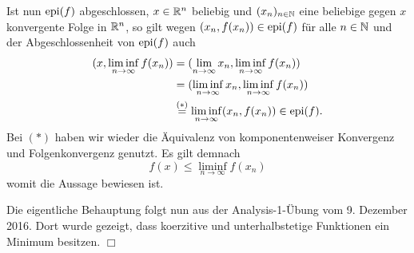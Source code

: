 \begin{itemize}
 \newpage

 Ist nun $\operatorname{epi}(f)$ abgeschlossen, $x\in\mathbb{R}^n$ beliebig und $(x_n)_{n\in\mathbb{N}}$ eine beliebige gegen $x$ konvergente Folge in $\mathbb{R}^n$, so gilt
 wegen $(x_n,f(x_n))\in\operatorname{epi}(f)$ für alle $n\in\mathbb{N}$ und der Abgeschlossenheit von $\operatorname{epi}(f) $ auch
 \begin{align*}
 (x,\liminf_{n\to\infty}f(x_n)) &= (\lim_{n\to\infty}x_n, \liminf_{n\to\infty}f(x_n)) \\
&= (\liminf_{n\to\infty} x_n, \liminf_{n\to\infty}f(x_n)) \\
&\overset{(*)}{=} \liminf_{n\to\infty}(x_n, f(x_n))\in \operatorname{epi}(f).
 \end{align*}
 Bei $(*)$ haben wir wieder die Äquivalenz von komponentenweiser Konvergenz und Folgenkonvergenz
 genutzt.
 Es gilt demnach
 \begin{displaymath}
  f(x)\leq \liminf_{n\to\infty}f(x_n)
 \end{displaymath}
 womit die Aussage bewiesen ist. 

 Die eigentliche Behauptung folgt nun aus der Analysis-1-Übung vom 9. Dezember 2016. Dort wurde gezeigt, dass koerzitive und unterhalbstetige Funktionen ein
 Minimum besitzen. \hfill$\Box$
\end{itemize}
